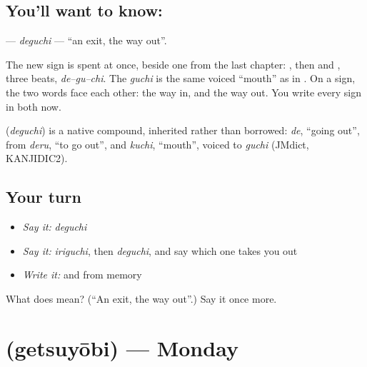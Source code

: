 \subsection*{You'll want to know: }
\textbf{} — \emph{deguchi} — \textquotedblleft{}an exit, the way out\textquotedblright{}.

The new sign is spent at once, beside one from the last chapter: \textbf{}, then \textbf{} and \textbf{}, three beats, \emph{de–gu–chi}. The \emph{guchi} is the same voiced \textquotedblleft{}mouth\textquotedblright{} as in \textbf{}. On a sign, the two words face each other: the way in, and the way out. You write every sign in both now.

\begin{cousinweb}
\textbf{} (\emph{deguchi}) is a native compound, inherited rather than borrowed: \emph{de}, \textquotedblleft{}going out\textquotedblright{}, from \emph{deru}, \textquotedblleft{}to go out\textquotedblright{}, and \emph{kuchi}, \textquotedblleft{}mouth\textquotedblright{}, voiced to \emph{guchi} (JMdict, KANJIDIC2).
\end{cousinweb}

\subsection*{Your turn}
\begin{itemize}
\raggedright
  \item \emph{Say it:} \emph{deguchi}
  \item \emph{Say it:} \emph{iriguchi}, then \emph{deguchi}, and say which one takes you out
  \item \emph{Write it:} \textbf{} and \textbf{} from memory
\end{itemize}

\begin{tcolorbox}[breakable,colback=teal!4,colframe=teal!35!black,title={Before you move on}]
What does  mean? (\textquotedblleft{}An exit, the way out\textquotedblright{}.) Say it once more.
\end{tcolorbox}
\section[\texorpdfstring{\ja{げつようび} (getsuyōbi)}{げつようび (getsuyōbi)}]{ (getsuyōbi) — Monday}

\label{lesson:JA-C135-getsuyoubi}



